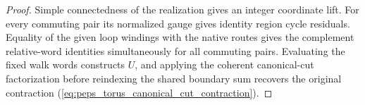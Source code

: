 \begin{proof}\leanok
    Simple connectedness of the realization gives an integer
    coordinate lift. For every commuting pair its normalized gauge
    gives identity region cycle residuals. Equality of the given
    loop windings with the native routes gives the complement
    relative-word identities simultaneously for all commuting pairs.
    Evaluating the fixed walk words constructs $U$, and applying the
    coherent canonical-cut factorization before reindexing the shared
    boundary sum recovers the original contraction
    (\ref{eq:peps_torus_canonical_cut_contraction}).
\end{proof}
